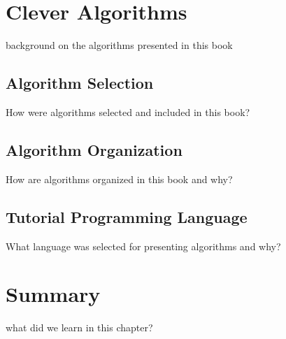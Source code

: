 \section{Clever Algorithms}
background on the algorithms presented in this book

\subsection{Algorithm Selection}
How were algorithms selected and included in this book?

\subsection{Algorithm Organization}
How are algorithms organized in this book and why?

\subsection{Tutorial Programming Language}
What language was selected for presenting algorithms and why?



\section{Summary}
what did we learn in this chapter?
